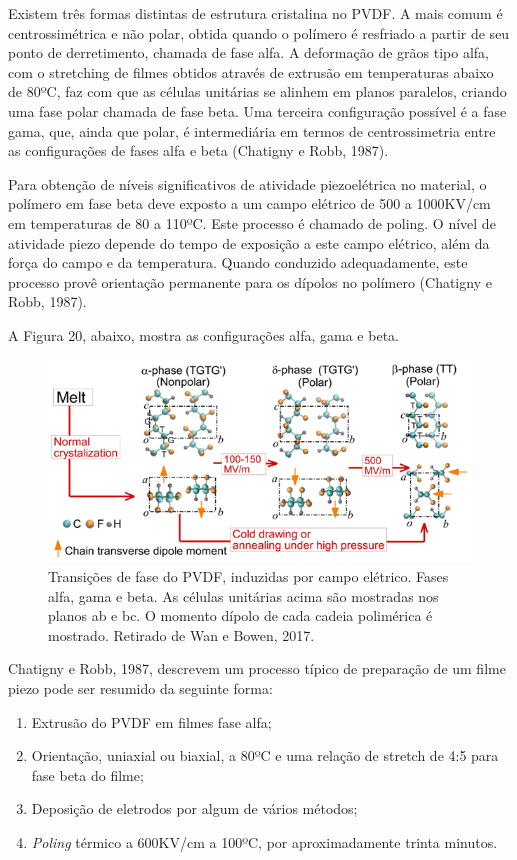 \documentclass[
	12pt,				
	oneside,			
	a4paper,			
	english,			
	brazil				
	]{abntex2ppgsi}
\begin{document}
Existem três formas distintas de estrutura cristalina no PVDF. A mais comum é centrossimétrica e não polar, obtida quando o polímero é resfriado a partir de seu ponto de derretimento, chamada de fase alfa. A deformação de grãos tipo alfa, com o stretching de filmes obtidos através de extrusão em temperaturas abaixo de 80ºC, faz com que as células unitárias se alinhem em planos paralelos, criando uma fase polar chamada de fase beta. Uma terceira configuração possível é a fase gama, que, ainda que polar, é intermediária em termos de centrossimetria entre as configurações de fases alfa e beta (Chatigny e Robb, 1987).

Para obtenção de níveis significativos de atividade piezoelétrica no material, o polímero em fase beta deve exposto a um campo elétrico de 500 a 1000KV/cm em temperaturas de 80 a 110ºC. Este processo é chamado de poling. O nível de atividade piezo depende do tempo de exposição a este campo elétrico, além da força do campo e da temperatura. Quando conduzido adequadamente, este processo provê orientação permanente para os dípolos no polímero (Chatigny e Robb, 1987).

A Figura 20, abaixo, mostra as configurações alfa, gama e beta.

\begin{figure}[!htb]
\centering
\includegraphics{Figura20}
\caption {Transições de fase do PVDF, induzidas por campo elétrico. Fases alfa, gama e beta. As células unitárias acima são mostradas nos planos ab e bc. O momento dípolo de cada cadeia polimérica é mostrado. Retirado de Wan e Bowen, 2017.}
\label{Figura20}
\end{figure}

Chatigny e Robb, 1987, descrevem um processo típico de preparação de um filme piezo pode ser resumido da seguinte forma:

\begin{enumerate}
	\item Extrusão do PVDF em filmes fase alfa; 
	\item Orientação, uniaxial ou biaxial, a 80ºC e uma relação de stretch de 4:5 para fase beta do filme;
	\item Deposição de eletrodos por algum de vários métodos;
	\item \textit{Poling} térmico a 600KV/cm a 100ºC, por aproximadamente trinta minutos.
\end{enumerate}
\end{document}
